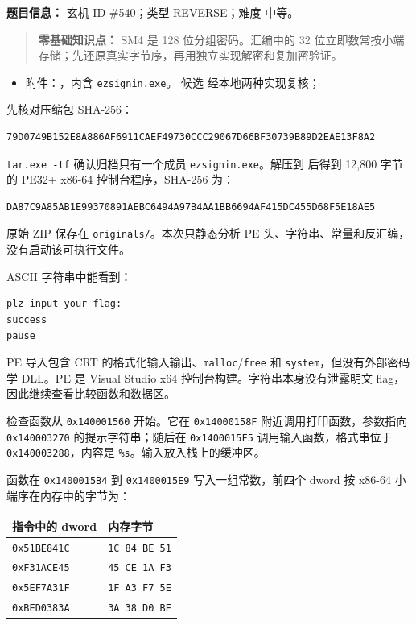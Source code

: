 \textbf{题目信息：} 玄机 ID \#540；类型 REVERSE；难度 中等。

\begin{quote}
\textbf{零基础知识点：} SM4 是 128 位分组密码。汇编中的 32 位立即数常按小端存储；先还原真实字节序，再用独立实现解密和复加密验证。
\end{quote}

\begin{itemize}
\tightlist
\item
  附件：\texttt{}，内含 \texttt{ezsignin.exe}。 候选 \texttt{} 经本地两种实现复核；
\end{itemize}

先核对压缩包 SHA-256：

\begin{verbatim}
79D0749B152E8A886AF6911CAEF49730CCC29067D66BF30739B89D2EAE13F8A2
\end{verbatim}

\texttt{tar.exe\ -tf} 确认归档只有一个成员 \texttt{ezsignin.exe}。解压到 \texttt{} 后得到 12,800 字节的 PE32+ x86-64 控制台程序，SHA-256 为：

\begin{verbatim}
DA87C9A85AB1E99370891AEBC6494A97B4AA1BB6694AF415DC455D68F5E18AE5
\end{verbatim}

原始 ZIP 保存在 \texttt{originals/}。本次只静态分析 PE 头、字符串、常量和反汇编，没有启动该可执行文件。

ASCII 字符串中能看到：

\begin{verbatim}
plz input your flag:
success
pause
\end{verbatim}

PE 导入包含 CRT 的格式化输入输出、\texttt{malloc}/\texttt{free} 和 \texttt{system}，但没有外部密码学 DLL。PE 是 Visual Studio x64 控制台构建。字符串本身没有泄露明文 flag，因此继续查看比较函数和数据区。

检查函数从 \texttt{0x140001560} 开始。它在 \texttt{0x14000158F} 附近调用打印函数，参数指向 \texttt{0x140003270} 的提示字符串；随后在 \texttt{0x1400015F5} 调用输入函数，格式串位于 \texttt{0x140003288}，内容是 \texttt{\%s}。输入放入栈上的缓冲区。

函数在 \texttt{0x1400015B4} 到 \texttt{0x1400015E9} 写入一组常数，前四个 dword 按 x86-64 小端序在内存中的字节为：

{\def\LTcaptype{} %
\begin{longtable}[]{@{}ll@{}}
\toprule\noalign{}
指令中的 dword & 内存字节 \\
\midrule\noalign{}
\endhead
\bottomrule\noalign{}
\endlastfoot
\texttt{0x51BE841C} & \texttt{1C\ 84\ BE\ 51} \\
\texttt{0xF31ACE45} & \texttt{45\ CE\ 1A\ F3} \\
\texttt{0x5EF7A31F} & \texttt{1F\ A3\ F7\ 5E} \\
\texttt{0xBED0383A} & \texttt{3A\ 38\ D0\ BE} \\
\end{longtable}
}

